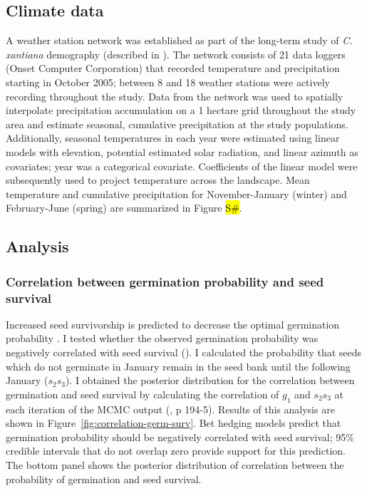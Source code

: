 \documentclass[12pt, oneside, titlepage]{article}   	%
\begin{document}
{\subsection{Climate data}

A weather station network was established as part of the long-term study of \textit{C. xantiana} demography (described in \cite{eckhart2011}). The network consists of 21 data loggers (Onset Computer Corporation) that recorded temperature and precipitation starting in October 2005; between 8 and 18 weather stations were actively recording throughout the study. Data from the network was used to spatially interpolate precipitation accumulation on a 1 hectare grid throughout the study area and estimate seasonal, cumulative precipitation at the study populations. Additionally, seasonal temperatures in each year were estimated using linear models with elevation, potential estimated solar radiation, and linear azimuth as covariates; year was a categorical covariate. Coefficients of the linear model were subsequently used to project temperature across the landscape. Mean temperature and cumulative precipitation for November-January (winter) and February-June (spring) are summarized in Figure \hl{S\#}.

\subsection{Analysis}

\subsubsection{Correlation between germination probability and seed survival}

Increased seed survivorship is predicted to decrease the optimal germination probability \cite{cohen1966,ellner1985a}. I tested whether the observed germination probability was negatively correlated with seed survival (\cite{gremer2014}). I calculated the probability that seeds which do not germinate in January remain in the seed bank until the following January ($s_2 s_3$). I obtained the posterior distribution for the correlation between germination and seed survival by calculating the correlation of $g_1$ and $s_2 s_3$ at each iteration of the MCMC output (\cite{hobbs2015b}, p 194-5). Results of this analysis are shown in Figure~\ref{fig:correlation-germ-surv}. Bet hedging models predict that germination probability should be negatively correlated with seed survival; 95\% credible intervals that do not overlap zero provide support for this prediction. The bottom panel shows the posterior distribution of correlation between the probability of germination and seed survival. 

}
\end{document}
